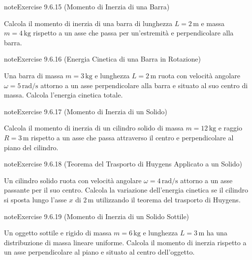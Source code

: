 \documentclass[letterpaper,10pt,italian]{jupyterBook}
\begin{document}
\begin{sphinxadmonition}{note}{Exercise 9.6.15 (Momento di Inerzia di una Barra)}



\sphinxAtStartPar
Calcola il momento di inerzia di una barra di lunghezza \(L = 2 \, \text{m}\) e massa \(m = 4 \, \text{kg}\) rispetto a un asse che passa per un’estremità e perpendicolare alla barra.
\end{sphinxadmonition}
 \label{exercise:ch/mechanics/inertia-problems-exercise-15}

\begin{sphinxadmonition}{note}{Exercise 9.6.16 (Energia Cinetica di una Barra in Rotazione)}



\sphinxAtStartPar
Una barra di massa \(m = 3 \, \text{kg}\) e lunghezza \(L = 2 \, \text{m}\) ruota con velocità angolare \(\omega = 5 \, \text{rad/s}\) attorno a un asse perpendicolare alla barra e situato al suo centro di massa. Calcola l’energia cinetica totale.
\end{sphinxadmonition}
 \label{exercise:ch/mechanics/inertia-problems-exercise-16}

\begin{sphinxadmonition}{note}{Exercise 9.6.17 (Momento di Inerzia di un Solido)}



\sphinxAtStartPar
Calcola il momento di inerzia di un cilindro solido di massa \(m = 12 \, \text{kg}\) e raggio \(R = 3 \, \text{m}\) rispetto a un asse che passa attraverso il centro e perpendicolare al piano del cilindro.
\end{sphinxadmonition}
 \label{exercise:ch/mechanics/inertia-problems-exercise-17}

\begin{sphinxadmonition}{note}{Exercise 9.6.18 (Teorema del Trasporto di Huygens Applicato a un Solido)}



\sphinxAtStartPar
Un cilindro solido ruota con velocità angolare \(\omega = 4 \, \text{rad/s}\) attorno a un asse passante per il suo centro. Calcola la variazione dell’energia cinetica se il cilindro si sposta lungo l’asse \(x\) di \(2 \, \text{m}\) utilizzando il teorema del trasporto di Huygens.
\end{sphinxadmonition}
 \label{exercise:ch/mechanics/inertia-problems-exercise-18}

\begin{sphinxadmonition}{note}{Exercise 9.6.19 (Momento di Inerzia di un Solido Sottile)}



\sphinxAtStartPar
Un oggetto sottile e rigido di massa \(m = 6 \, \text{kg}\) e lunghezza \(L = 3 \, \text{m}\) ha una distribuzione di massa lineare uniforme. Calcola il momento di inerzia rispetto a un asse perpendicolare al piano e situato al centro dell’oggetto.
\end{sphinxadmonition}
 \label{exercise:ch/mechanics/inertia-problems-exercise-19}
\end{document}
